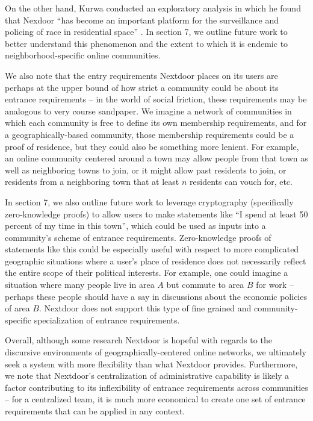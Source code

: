\documentclass[sigconf,authordraft]{acmart}
\begin{document}
On the other hand, Kurwa conducted an exploratory analysis in which he found that Nexdoor ``has become an important platform for the surveillance and policing of race in residential space'' \cite{kurwa2019building}. In section 7, we outline future work to better understand this phenomenon and the extent to which it is endemic to neighborhood-specific online communities.

We also note that the entry requirements Nextdoor places on its users are perhaps at the upper bound of how strict a community could be about its entrance requirements -- in the world of social friction, these requirements may be analogous to very course sandpaper. We imagine a network of communities in which each community is free to define its own membership requirements, and for a geographically-based community, those membership requirements could be a proof of residence, but they could also be something more lenient. For example, an online community centered around a town may allow people from that town as well as neighboring towns to join, or it might allow past residents to join, or residents from a neighboring town that at least $n$ residents can vouch for, etc. 

In section 7, we also outline future work to leverage cryptography (specifically zero-knowledge proofs) to allow users to make statements like ``I spend at least 50 percent of my time in this town'', which could be used as inputs into a community's scheme of entrance requirements. Zero-knowledge proofs of statements like this could be especially useful with respect to more complicated geographic situations where a user's place of residence does not necessarily reflect the entire scope of their political interests. For example, one could imagine a situation where many people live in area $A$ but commute to area $B$ for work -- perhaps these people should have a say in discussions about the economic policies of area $B$. Nextdoor does not support  this type of fine grained and community-specific specialization of entrance requirements.

Overall, although some research Nextdoor is hopeful with regards to the discursive environments of geographically-centered online networks, we ultimately seek a system with more flexibility than what Nextdoor provides. Furthermore, we note that Nextdoor's centralization of administrative capability is likely a factor contributing to its inflexibility of entrance requirements across communities -- for a centralized team, it is much more economical to create one set of entrance requirements that can be applied in any context.
\end{document}
